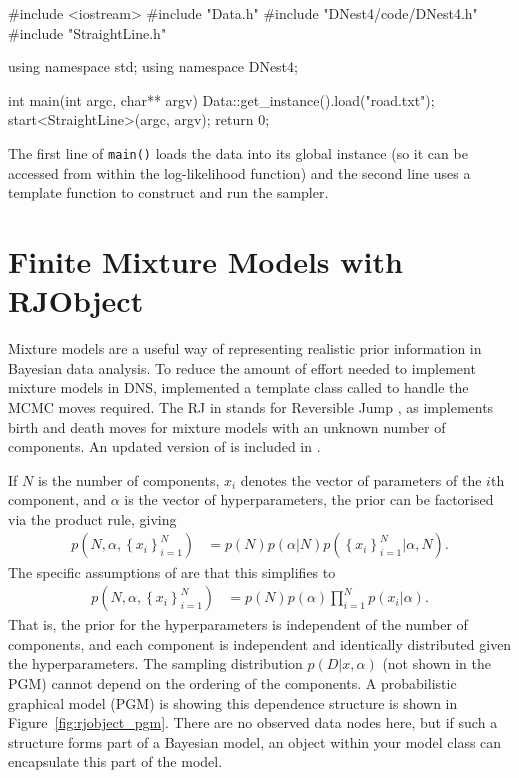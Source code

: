 \documentclass[article]{jss}
\begin{document}
\begin{CodeChunk}
\begin{CodeInput}
#include <iostream>
#include "Data.h"
#include "DNest4/code/DNest4.h"
#include "StraightLine.h"

using namespace std;
using namespace DNest4;

int main(int argc, char** argv)
{
    Data::get_instance().load("road.txt");
    start<StraightLine>(argc, argv);
    return 0;
}
\end{CodeInput}
\end{CodeChunk}


The first line of {\tt main()} loads the data into its global instance
(so it can be accessed from within the log-likelihood function)
and the second line uses a  template function to construct
and run the sampler.

\section{Finite Mixture Models with RJObject}
Mixture models are a useful way of representing realistic prior information
in Bayesian data analysis. To reduce the amount of effort needed to
implement mixture models in DNS, \citet{rjobject} implemented
a template class called  to handle the MCMC moves
required. The RJ in  stands for Reversible Jump \citep{green}, as
 implements birth and death moves for mixture
models with an unknown number of components. An updated version of
 is included in .

If $N$ is the number of components, $x_i$ denotes the vector of parameters
of the $i$th component, and $\alpha$ is the vector of hyperparameters, the prior
can be factorised via the product rule, giving
\begin{align}
p\left(N, \alpha, \left\{x_i\right\}_{i=1}^N\right)
&= p(N)p(\alpha | N)p\left(\left\{x_i\right\}_{i=1}^N | \alpha, N\right).
\end{align}
The specific assumptions of  are that this simplifies to
\begin{align}
p\left(N, \alpha, \left\{x_i\right\}_{i=1}^N\right)
&= p(N)p(\alpha)
\prod_{i=1}^N
p\left(x_i | \alpha\right).\label{eqn:rjobject}
\end{align}
That is, the prior for the hyperparameters is independent of the number of
components, and each component is independent and identically
distributed given the hyperparameters. The sampling distribution
$p(D | x, \alpha)$ (not shown in the PGM)
cannot depend on the ordering of the components.
A probabilistic graphical model (PGM) is showing this dependence
structure is shown in Figure~\ref{fig:rjobject_pgm}. There are no observed
data nodes here, but if such a structure forms part of a
Bayesian model, an  object within your model class
can encapsulate this part of the model.
\end{document}
